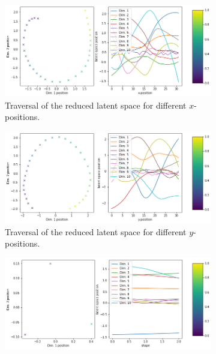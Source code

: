 \begin{figure}[H]
    \centering
    \begin{subfigure}{.48\textwidth}
        \includegraphics[width=\textwidth]{images/latent_space_traversals/vae_7500_dsprites_latent_space_values_x_position.png}
        \caption{Traversal of the reduced latent space for different $x$-positions.}
    \end{subfigure}
    \begin{subfigure}{.48\textwidth}
        \includegraphics[width=\textwidth]{images/latent_space_traversals/vae_7500_dsprites_latent_space_values_y_position.png}
        \caption{Traversal of the reduced latent space for different $y$-positions.}
    \end{subfigure}
    \begin{subfigure}{.48\textwidth}
        \includegraphics[width=\textwidth]{images/latent_space_traversals/vae_7500_dsprites_latent_space_values_shape.png}

\end{subfigure}
\end{figure}
